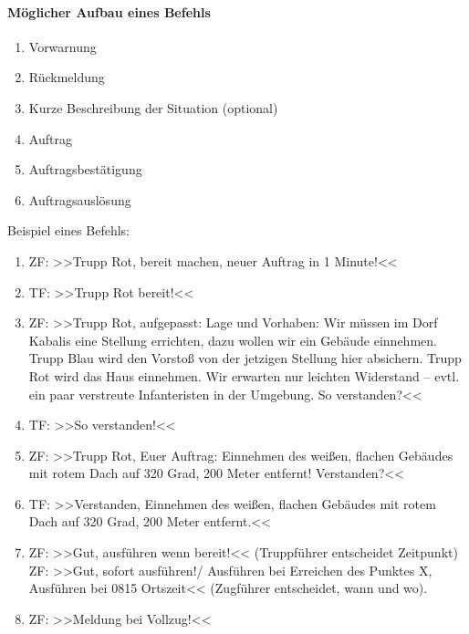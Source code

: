 \paragraph*{Möglicher Aufbau eines Befehls}
\begin{enumerate}
	\item Vorwarnung
	\item Rückmeldung
	\item Kurze Beschreibung der Situation (optional)
	\item Auftrag
	\item Auftragsbestätigung
	\item Auftragsauslösung
\end{enumerate}

Beispiel eines Befehls:
\begin{enumerate}
	\item ZF: >>Trupp Rot, bereit machen, neuer Auftrag in 1 Minute!<<
	\item TF: >>Trupp Rot bereit!<<
	\item ZF: >>Trupp Rot, aufgepasst: Lage und Vorhaben: Wir müssen im Dorf Kabalis eine Stellung errichten, dazu wollen wir ein Gebäude einnehmen. Trupp Blau wird den Vorstoß von der jetzigen Stellung hier absichern. Trupp Rot wird das Haus einnehmen. Wir erwarten nur leichten Widerstand -- evtl. ein paar verstreute Infanteristen in der Umgebung. So verstanden?<<
	\item TF: >>So verstanden!<<
	\item ZF: >>Trupp Rot, Euer Auftrag: Einnehmen des weißen, flachen Gebäudes mit rotem Dach auf 320 Grad, 200 Meter entfernt! Verstanden?<<
	\item TF: >>Verstanden, Einnehmen des weißen, flachen Gebäudes mit rotem Dach auf 320 Grad, 200 Meter entfernt.<<
	\item ZF: >>Gut, ausführen wenn bereit!<< (Truppführer entscheidet Zeitpunkt)\\ 
	ZF: >>Gut, sofort ausführen!/ Ausführen bei Erreichen des Punktes X, Ausführen bei 0815 Ortszeit<< (Zugführer entscheidet, wann und wo).
	\item ZF: >>Meldung bei Vollzug!<<
\end{enumerate}


